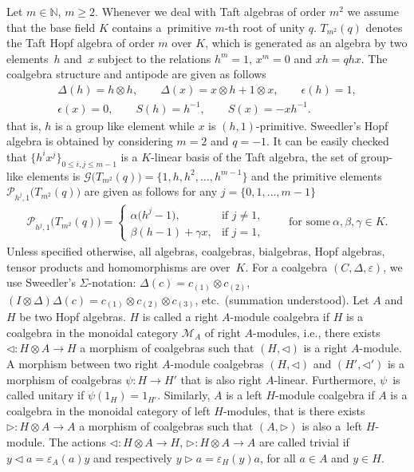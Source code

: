 \documentclass[11pt]{article}
\numberwithin{equation}{section}
\begin{document}
Let $m \in \mathbb{N}$, $m \geq 2$. Whenever we deal with Taft algebras of order $m^{2}$ we assume that the base field $K$ contains a~primitive $m$-th root of unity $q$. $T_{m^{2}}(q)$ denotes the Taft Hopf algebra of order $m$ over $K$, which is generated as an algebra by two elements~$h$ and~$x$ subject to the relations $h^{m} = 1$, $x^{m} = 0$ and $xh = qhx$. The coalgebra structure and antipode are given as follows
\begin{gather*}
\Delta(h) = h \otimes h, \qquad \Delta(x) = x \otimes h + 1 \otimes x, \qquad \epsilon(h) = 1,\\
 \epsilon(x) = 0,\qquad S(h) = h^{-1},\qquad S(x) = -xh^{-1}.
\end{gather*}
that is, $h$ is a group like element while $x$ is $(h,1)$-primitive. Sweedler's Hopf algebra is obtained by considering $m=2$ and $q = -1$. It can be easily checked that $\{h^{i}x^{j}\}_{0 \leq i, j \leq m-1}$ is a $K$-linear basis of the Taft algebra, the set of group-like elements is
$\mathcal{G}\big(T_{m^{2}}(q)\big) = \{1, h, h^{2},\dots, h^{m-1}\}$ and the primitive elements $\mathcal{P}_{h^{j}, 1}\big(T_{m^{2}}(q)\big)$ are given as follows for any $j = \{0, 1,\dots, m-1\}$
\begin{gather*}\mathcal{P}_{h^{j}, 1} \big(T_{m^{2}}(q)\big) = \begin{cases}
\alpha\big(h^{j} - 1\big), & \text{if } j \neq 1,\\
\beta(h-1)+ \gamma x, & \text {if } j=1,
\end{cases}\qquad \text{for some} \ \alpha, \beta, \gamma \in K.\end{gather*}
Unless specified otherwise, all algebras, coalgebras, bialgebras, Hopf algebras, tensor products and homomorphisms are over~$K$. For a coalgebra $(C, \Delta, \varepsilon)$, we use Sweedler's $\Sigma$-notation: $\Delta(c) = c_{(1)}\otimes c_{(2)}$, $(I\otimes \Delta)\Delta(c) = c_{(1)}\otimes
c_{(2)}\otimes c_{(3)}$, etc.\ (summation understood). Let $A$ and $H$ be two Hopf algebras. $H$ is called a right $A$-module coalgebra if $H$ is a coalgebra in the monoidal category ${\mathcal M}_A $ of right $A$-modules, i.e., there exists $\triangleleft \colon H \otimes A \rightarrow H$ a morphism of coalgebras such that $(H,\triangleleft) $ is a right $A$-module. A morphism between two right $A$-module coalgebras $(H, \triangleleft)$ and $(H',\triangleleft')$ is a morphism of coalgebras $\psi\colon H \to H'$ that is also right $A$-linear. Furthermore, $\psi$~is called unitary if
$\psi (1_H) = 1_{H'}$. Similarly, $A$ is a left $H$-module coalgebra if $A$ is a coalgebra in the monoidal category of left $H$-modules, that is there exists $\triangleright \colon H \otimes A \to A$ a morphism of coalgebras such that $(A, \triangleright)$ is also a~left $H$-module. The actions $\triangleleft \colon H \otimes A \rightarrow H$, $\triangleright: H \otimes A \rightarrow A$ are called trivial if $y \triangleleft a = \varepsilon_A (a) y$ and respectively $y \triangleright a = \varepsilon_H(y) a$, for all $a\in A$ and $y\in H$.
\end{document}
